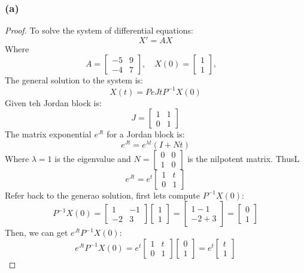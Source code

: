 \documentclass{article}
\begin{document}
\subsubsection*{(a)}
\begin{proof}
    To solve the system of differential equations:
    \[ X' = AX \]
    Where 
    \[ A = 
        \begin{bmatrix}
            -5 & 9 \\ -4 & 7
        \end{bmatrix},
        \quad
        X(0) = 
        \begin{bmatrix}
            1 \\ 1
        \end{bmatrix},
        \quad
    \]
    The general solution to the system is:
    \[ X(t) = Pe{Jt}P^{-1}X(0) \]
    Given teh Jordan block is:
    \[ J = \begin{bmatrix} 1 & 1 \\ 0 & 1 \end{bmatrix} \] 
    The matrix exponential $e^{Jt}$ for a Jordan block is:
    \[ e^{Jt} = e^{\lambda t}(I + Nt) \]
    Where $\lambda = 1$ is the eigenvalue and $N = \begin{bmatrix} 0 & 0 \\ 1 & 0 \end{bmatrix}$ is the nilpotent matrix. ThusL
    \[ e^{Jt} = e^t \begin{bmatrix} 1 & t \\ 0 & 1 \end{bmatrix} \]
    Refer back to the generao solution, first lets compute $P^{-1}X(0)$:
    \[ P^{-1}X(0) = \begin{bmatrix} 1 & -1 \\ -2 & 3 \end{bmatrix} \begin{bmatrix} 1  \\ 1 \end{bmatrix} = \begin{bmatrix} 1 - 1 \\ -2 + 3 \end{bmatrix} = \begin{bmatrix} 0 \\ 1 \end{bmatrix} \]
    Then, we can get $e^{Jt}P^{-1}X(0)$:
    \[ e^{Jt}P^{-1}X(0) = e^t \begin{bmatrix} 1 & t \\ 0 & 1 \end{bmatrix} \begin{bmatrix} 0 \\ 1 \end{bmatrix} = e^t \begin{bmatrix} t \\ 1 \end{bmatrix} \]

\end{proof}
\end{document}
